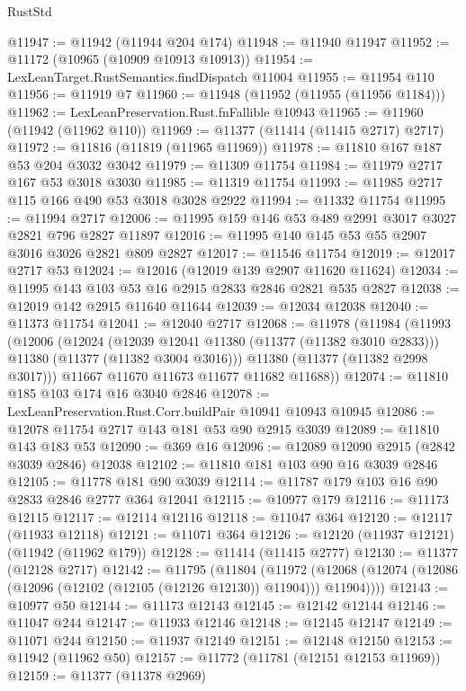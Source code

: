 \begin{lexlean}{RustStd}
\begin{coremodule}
{\begin{coremodule}
{{{{{{{{{{{{{{{{{{{{{{{{{{{{{{{{{@11947 := @11942 (@11944 @204 @174)
@11948 := @11940 @11947
@11952 := @11172 (@10965 (@10909 @10913 @10913))
@11954 := LexLeanTarget.RustSemantics.findDispatch @11004
@11955 := @11954 @110
@11956 := @11919 @7
@11960 := @11948 (@11952 (@11955 (@11956 @1184)))
@11962 := LexLeanPreservation.Rust.fnFallible @10943
@11965 := @11960 (@11942 (@11962 @110))
@11969 := @11377 (@11414 (@11415 @2717) @2717)
@11972 := @11816 (@11819 (@11965 @11969))
@11978 := @11810 @167 @187 @53 @204 @3032 @3042
@11979 := @11309 @11754
@11984 := @11979 @2717 @167 @53 @3018 @3030
@11985 := @11319 @11754
@11993 := @11985 @2717 @115 @166 @490 @53 @3018 @3028 @2922
@11994 := @11332 @11754
@11995 := @11994 @2717
@12006 := @11995 @159 @146 @53 @489 @2991 @3017 @3027 @2821 @796 @2827 @11897
@12016 := @11995 @140 @145 @53 @55 @2907 @3016 @3026 @2821 @809 @2827
@12017 := @11546 @11754
@12019 := @12017 @2717 @53
@12024 := @12016 (@12019 @139 @2907 @11620 @11624)
@12034 := @11995 @143 @103 @53 @16 @2915 @2833 @2846 @2821 @535 @2827
@12038 := @12019 @142 @2915 @11640 @11644
@12039 := @12034 @12038
@12040 := @11373 @11754
@12041 := @12040 @2717
@12068 := @11978
    (@11984
      (@11993
        (@12006
          (@12024
            (@12039 @12041 @11380 (@11377 (@11382 @3010 @2833)))
            @11380
            (@11377 (@11382 @3004 @3016)))
          @11380
          (@11377 (@11382 @2998 @3017)))
        @11667
        @11670
        @11673
        @11677
        @11682
        @11688))
@12074 := @11810 @185 @103 @174 @16 @3040 @2846
@12078 := LexLeanPreservation.Rust.Corr.buildPair @10941 @10943 @10945
@12086 := @12078 @11754 @2717 @143 @181 @53 @90 @2915 @3039
@12089 := @11810 @143 @183 @53
@12090 := @369 @16
@12096 := @12089 @12090 @2915 (@2842 @3039 @2846) @12038
@12102 := @11810 @181 @103 @90 @16 @3039 @2846
@12105 := @11778 @181 @90 @3039
@12114 := @11787 @179 @103 @16 @90 @2833 @2846 @2777 @364 @12041
@12115 := @10977 @179
@12116 := @11173 @12115
@12117 := @12114 @12116
@12118 := @11047 @364
@12120 := @12117 (@11933 @12118)
@12121 := @11071 @364
@12126 := @12120 (@11937 @12121) (@11942 (@11962 @179))
@12128 := @11414 (@11415 @2777)
@12130 := @11377 (@12128 @2717)
@12142 := @11795
    (@11804
      (@11972 (@12068 (@12074 (@12086 (@12096 (@12102 (@12105 (@12126 @12130)) @11904))) @11904))))
@12143 := @10977 @50
@12144 := @11173 @12143
@12145 := @12142 @12144
@12146 := @11047 @244
@12147 := @11933 @12146
@12148 := @12145 @12147
@12149 := @11071 @244
@12150 := @11937 @12149
@12151 := @12148 @12150
@12153 := @11942 (@11962 @50)
@12157 := @11772 (@11781 (@12151 @12153 @11969))
@12159 := @11377 (@11378 @2969)
}}}}}}}}}}}}}}}}}}}}}}}}}}}}}}}}}
\end{coremodule}}
\end{coremodule}
\end{lexlean}

